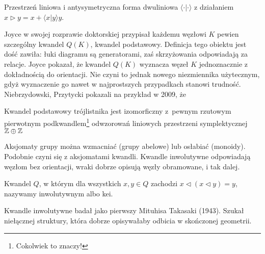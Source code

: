 \begin{example}
%
    Przestrzeń liniowa i antysymetryczna forma dwuliniowa $\langle \cdot | \cdot \rangle$ z działaniem $x \triangleright y = x + \langle x | y \rangle y$.
\end{example}

Joyce w swojej rozprawie doktorskiej przypisał każdemu węzłowi $K$ pewien szczególny kwandel $Q(K)$, kwandel podstawowy.
%
%
Definicja tego obiektu jest dość zawiła: łuki diagramu są generatorami, zaś skrzyżowania odpowiadają za relacje.
Joyce pokazał, że kwandel $Q(K)$ wyznacza węzeł $K$ jednoznacznie z dokładnością do orientacji.
Nie czyni to jednak nowego niezmiennika użytecznym, gdyż wyznaczenie go nawet w najprostszych przypadkach stanowi trudność.
Niebrzydowski, Przytycki \cite{niebrzydowski09} pokazali na przykład w 2009, że
%
%

\begin{example}
    Kwandel podstawowy trójlistnika  jest izomorficzny z~pewnym rzutowym pierwotnym podkwandlem\footnote{Cokolwiek to znaczy!} odwzorowań liniowych przestrzeni symplektycznej $\mathbb Z \oplus \mathbb Z$
\end{example}

Aksjomaty grupy można wzmacniać (grupy abelowe) lub osłabiać (monoidy).
Podobnie czyni się z aksjomatami kwandli.
Kwandle inwolutywne odpowiadają węzłom bez orientacji, wraki dobrze opisują węzły obramowane, i tak dalej.
%
%

\begin{definition}
%
%
    Kwandel $Q$, w którym dla wszystkich $x, y \in Q$ zachodzi $x \triangleleft (x \triangleleft y) = y$, nazywamy inwolutywnym albo kei.
\end{definition}

Kwandle inwolutywne badał jako pierwszy Mituhisa Takasaki (1943).
%
Szukał niełącznej struktury, która dobrze opisywałaby odbicia w skończonej geometrii.

